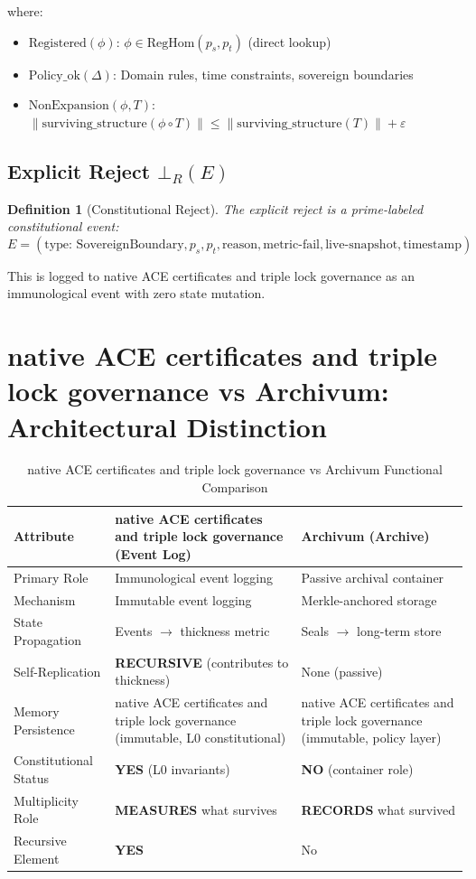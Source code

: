 \documentclass[11pt,a4paper]{article}
\newtheorem{definition}[theorem]{Definition}
\begin{document}
where:
\begin{itemize}
    \item $\text{Registered}(\phi)$: $\phi \in \text{RegHom}(p_s, p_t)$ (direct lookup)
    \item $\text{Policy\_ok}(\Delta)$: Domain rules, time constraints, sovereign boundaries
    \item $\text{NonExpansion}(\phi, T)$: $\|\text{surviving\_structure}(\phi \circ T)\| \leq \|\text{surviving\_structure}(T)\| + \varepsilon$
\end{itemize}

\subsection{Explicit Reject $\bot_R(E)$}

\begin{definition}[Constitutional Reject]\label{def:reject}
The explicit reject is a prime-labeled constitutional event:
$$E = (\text{type: SovereignBoundary}, p_s, p_t, \text{reason}, \text{metric-fail}, \text{live-snapshot}, \text{timestamp})$$
\end{definition}

This is logged to native ACE certificates and triple lock governance as an immunological event with zero state mutation.

\section{native ACE certificates and triple lock governance vs Archivum: Architectural Distinction}

\begin{table}[h]
\centering
\caption{native ACE certificates and triple lock governance vs Archivum Functional Comparison}
\label{tab:ace_archivum}
\begin{tabular}{@{}l l l@{}}
\toprule
\textbf{Attribute} & \textbf{native ACE certificates and triple lock governance (Event Log)} & \textbf{Archivum (Archive)} \\
\midrule
Primary Role & Immunological event logging & Passive archival container \\
Mechanism & Immutable event logging & Merkle-anchored storage \\
State Propagation & Events $\to$ thickness metric & Seals $\to$ long-term store \\
Self-Replication & \textbf{RECURSIVE} (contributes to thickness) & None (passive) \\
Memory Persistence & native ACE certificates and triple lock governance (immutable, L0 constitutional) & native ACE certificates and triple lock governance (immutable, policy layer) \\
Constitutional Status & \textbf{YES} (L0 invariants) & \textbf{NO} (container role) \\
Multiplicity Role & \textbf{MEASURES} what survives & \textbf{RECORDS} what survived \\
Recursive Element & \textbf{YES} & No \\
\bottomrule
\end{tabular}
\end{table}
\end{document}
